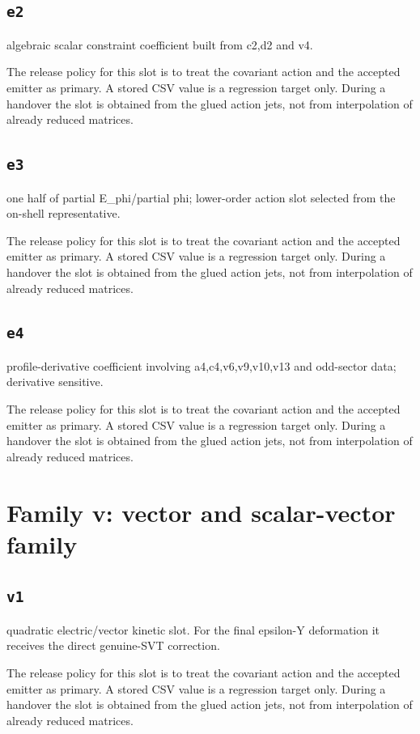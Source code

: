 \documentclass[11pt,a4paper,oneside]{book}
\begin{document}
\subsection{\texttt{e2}}
algebraic scalar constraint coefficient built from c2,d2 and v4.

The release policy for this slot is to treat the covariant action and the accepted emitter as primary. A stored CSV value is a regression target only. During a handover the slot is obtained from the glued action jets, not from interpolation of already reduced matrices.\par

\subsection{\texttt{e3}}
one half of partial E\_phi/partial phi; lower-order action slot selected from the on-shell representative.

The release policy for this slot is to treat the covariant action and the accepted emitter as primary. A stored CSV value is a regression target only. During a handover the slot is obtained from the glued action jets, not from interpolation of already reduced matrices.\par

\subsection{\texttt{e4}}
profile-derivative coefficient involving a4,c4,v6,v9,v10,v13 and odd-sector data; derivative sensitive.

The release policy for this slot is to treat the covariant action and the accepted emitter as primary. A stored CSV value is a regression target only. During a handover the slot is obtained from the glued action jets, not from interpolation of already reduced matrices.\par

\section{Family v: vector and scalar-vector family}
\subsection{\texttt{v1}}
quadratic electric/vector kinetic slot. For the final epsilon-Y deformation it receives the direct genuine-SVT correction.

The release policy for this slot is to treat the covariant action and the accepted emitter as primary. A stored CSV value is a regression target only. During a handover the slot is obtained from the glued action jets, not from interpolation of already reduced matrices.\par
\end{document}

